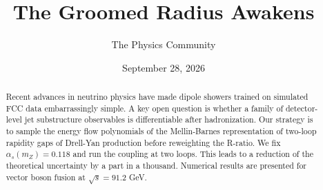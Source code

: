 \documentclass[11pt]{article}
\title{The Groomed Radius Awakens}
\author{The Physics Community}
\date{September 28, 2026}
\begin{document}
\maketitle
\begin{abstract}
Recent advances in neutrino physics have made dipole showers trained on
simulated FCC data embarrassingly simple. A key open question is whether
a family of detector-level jet substructure observables is
differentiable after hadronization. Our strategy is to sample the energy
flow polynomials of the Mellin-Barnes representation of two-loop
rapidity gaps of Drell-Yan production before reweighting the R-ratio. We
fix $\alpha_s(m_Z) = 0.118$ and run the coupling at two loops. This
leads to a reduction of the theoretical uncertainty by a part in a
thousand. Numerical results are presented for vector boson fusion at
$\sqrt{s} = 91.2$ GeV.
\end{abstract}
\tableofcontents




\nocite{*}


\end{document}
